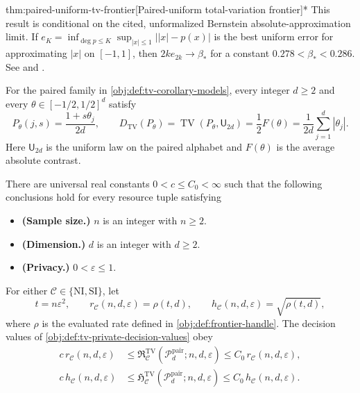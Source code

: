 \documentclass[11pt]{article}
\begin{document}
\begin{theoremv}{thm:paired-uniform-tv-frontier}[Paired-uniform total-variation frontier]*
This result is conditional on the cited, unformalized Bernstein absolute-approximation limit. If \(e_K=\inf_{\deg p\le K}\sup_{|x|\le1}\lvert |x|-p(x)\rvert\) is the best uniform error for approximating \(|x|\) on \([-1,1]\), then \(2k e_{2k}\to\beta_*\) for a constant \(0.278<\beta_*<0.286\). See \citet[Section 3.1]{CaiLow2011Nonsmooth} and \citet{Bernstein1913}.

For the paired family in \cref{obj:def:tv-corollary-models}, every integer \(d\ge2\) and every \(\theta\in[-1/2,1/2]^d\) satisfy
\[
 P_\theta(j,s)=\frac{1+s\theta_j}{2d},
 \qquad
 D_{\mathrm{TV}}(P_\theta)
 =\operatorname{TV}(P_\theta,\mathsf U_{2d})
 =\frac12F(\theta)
 =\frac{1}{2d}\sum_{j=1}^{d}|\theta_j|.
\]
Here \(\mathsf U_{2d}\) is the uniform law on the paired alphabet and \(F(\theta)\) is the average absolute contrast.

There are universal real constants \(0<c\le C_0<\infty\) such that the following conclusions hold for every resource tuple satisfying
\begin{itemize}
\item \textbf{(Sample size.)} \(n\) is an integer with \(n\ge2\).
\item \textbf{(Dimension.)} \(d\) is an integer with \(d\ge2\).
\item \textbf{(Privacy.)} \(0<\varepsilon\le1\).
\end{itemize}
For either \(\mathcal C\in\{\mathrm{NI},\mathrm{SI}\}\), let
\[
 t=n\varepsilon^2,\qquad
 r_{\mathcal C}(n,d,\varepsilon)=\rho(t,d),\qquad
 h_{\mathcal C}(n,d,\varepsilon)=\sqrt{\rho(t,d)},
\]
where \(\rho\) is the evaluated rate defined in \cref{obj:def:frontier-handle}. The decision values of \cref{obj:def:tv-private-decision-values} obey
\[
\begin{aligned}
 c\,r_{\mathcal C}(n,d,\varepsilon)
 &\le
 \mathfrak R^{\mathrm{TV}}_{\mathcal C}
   (\mathcal P_d^{\mathrm{pair}};n,d,\varepsilon)
 \le C_0\,r_{\mathcal C}(n,d,\varepsilon),\\
 c\,h_{\mathcal C}(n,d,\varepsilon)
 &\le
 \mathfrak H^{\mathrm{TV}}_{\mathcal C}
   (\mathcal P_d^{\mathrm{pair}};n,d,\varepsilon)
 \le C_0\,h_{\mathcal C}(n,d,\varepsilon).
\end{aligned}
\]


\end{theoremv}
\end{document}
